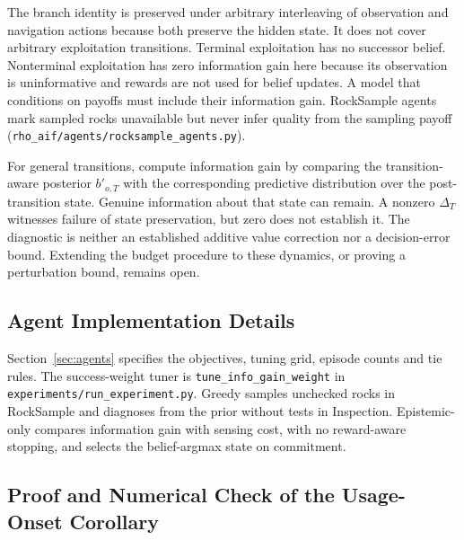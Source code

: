\documentclass[manuscript, screen, review]{jair}
\begin{document}
The branch identity is preserved under arbitrary interleaving of observation and navigation actions because both preserve the hidden state. It does not cover arbitrary exploitation transitions. Terminal exploitation has no successor belief. Nonterminal exploitation has zero information gain here because its observation is uninformative and rewards are not used for belief updates. A model that conditions on payoffs must include their information gain. RockSample agents mark sampled rocks unavailable but never infer quality from the sampling payoff (\texttt{rho\_\allowbreak aif/\allowbreak agents/\allowbreak rocksample\_\allowbreak agents.py}).

\begin{remark}
\label{rem:transition-aware}
For general transitions, compute information gain by comparing the transition-aware posterior $b'_{o,T}$ with the corresponding predictive distribution over the post-transition state. Genuine information about that state can remain. A nonzero $\Delta_T$ witnesses failure of state preservation, but zero does not establish it. The diagnostic is neither an established additive value correction nor a decision-error bound. Extending the budget procedure to these dynamics, or proving a perturbation bound, remains open.
\end{remark}



\subsection{Agent Implementation Details}
\label{app:theory_agents}

Section~\ref{sec:agents} specifies the objectives, tuning grid, episode counts and tie rules. The success-weight tuner is \texttt{tune\_\allowbreak info\_\allowbreak gain\_\allowbreak weight} in \texttt{experiments/\allowbreak run\_\allowbreak experiment.py}. Greedy samples unchecked rocks in RockSample and diagnoses from the prior without tests in Inspection. Epistemic-only compares information gain with sensing cost, with no reward-aware stopping, and selects the belief-argmax state on commitment.

\subsection{Proof and Numerical Check of the Usage-Onset Corollary}
\label{app:theory_budget_proofs}
\end{document}
